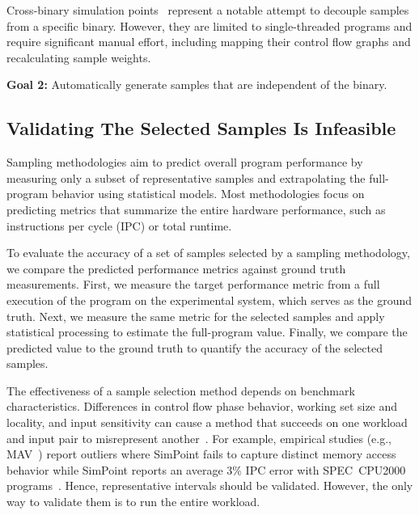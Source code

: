Cross-binary simulation points~\cite{cross_binary_simpoints} represent a notable attempt to decouple samples from a specific binary.
However, they are limited to single-threaded programs and require significant manual effort, including mapping their control flow graphs and recalculating sample weights.

\begin{tcolorbox}
\textbf{Goal 2:}
Automatically generate samples that are independent of the binary.
\end{tcolorbox}

\subsection{Validating The Selected Samples Is Infeasible}\label{sec:validating_the_selected_samples_is_infeasible}

Sampling methodologies aim to predict overall program performance by measuring only a subset of representative samples and extrapolating the full-program behavior using statistical models. 
Most methodologies focus on predicting metrics that summarize the entire hardware performance, such as instructions per cycle (IPC) or total runtime.

To evaluate the accuracy of a set of samples selected by a sampling methodology, we compare the predicted performance metrics against ground truth measurements. 
First, we measure the target performance metric from a full execution of the program on the experimental system, which serves as the ground truth. 
Next, we measure the same metric for the selected samples and apply statistical processing to estimate the full-program value. 
Finally, we compare the predicted value to the ground truth to quantify the accuracy of the selected samples.

The effectiveness of a sample selection method depends on benchmark characteristics.
Differences in control flow phase behavior, working set size and locality, and input sensitivity can cause a method that succeeds on one workload and input pair to misrepresent another~\cite{characterizing_and_comparing_prevailing_simulation_techniques,simpoint,hot-region-spec2017,xalancbmk,survey_phase_classification,eeckhout-microarchitecture-independent-signatures,MAV}.
For example, empirical studies (e.g., MAV~\cite{MAV}) report outliers where SimPoint fails to capture distinct memory access behavior while SimPoint reports an average 3\% IPC error with SPEC~CPU2000~\cite{spec2000} programs~\cite{wavelet-based}. 
Hence, representative intervals should be validated.
However, the only way to validate them is to run the entire workload.

